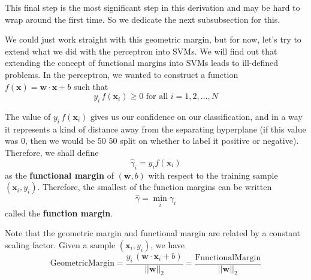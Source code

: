   This final step is the most significant step in this derivation and may be hard to wrap around the first time. So we dedicate the next subsubsection for this. 

  
  We could just work straight with this geometric margin, but for now, let's try to extend what we did with the perceptron into SVMs. We will find out that extending the concept of functional margins into SVMs leads to ill-defined problems. In the perceptron, we wanted to construct a function $f(\mathbf{x}) = \mathbf{w} \cdot \mathbf{x} + b$ such that 
  \begin{equation*}
    y_i \, f(\mathbf{x}_i) \geq 0 \text{ for all } i = 1, 2, \ldots, N
  \end{equation*}

  \begin{definition}
    The value of $y_i \, f(\mathbf{x}_i)$ gives us our confidence on our classification, and in a way it represents a kind of distance away from the separating hyperplane (if this value was $0$, then we would be 50 50 split on whether to label it positive or negative). Therefore, we shall define 
    \begin{equation*}
        \hat{\gamma}_i = y_i f(\mathbf{x}_i) 
    \end{equation*}
  as the \textbf{functional margin} of $(\mathbf{w}, b)$ with respect to the training sample $(\mathbf{x}_i, y_i)$. Therefore, the smallest of the function margins can be written 
  \begin{equation*}
      \hat{\gamma} = \min_i \gamma_i 
  \end{equation*}
  called the \textbf{function margin}. 
  \end{definition}

  Note that the geometric margin and functional margin are related by a constant scaling factor. Given a sample $(\mathbf{x}_i, y_i)$, we have 
  \begin{equation*}
      \mathrm{Geometric Margin} = \frac{y_i \, (\mathbf{w} \cdot \mathbf{x}_i + b)}{||\mathbf{w}||_2} = \frac{\mathrm{Functional Margin}}{||\mathbf{w}||_2}
  \end{equation*}

